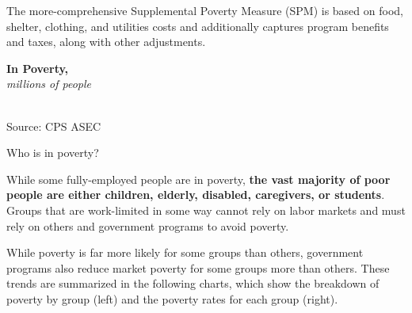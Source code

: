 \documentclass{report}
\newcommand{\barylab}[2]{yticklabel style={text width=#1, align=right, 
		style={black!70}, text height=#2},}
\newcommand{\bbar}[2]{extra #1 ticks = {{#2}}, extra #1 tick labels = ,
		extra #1 tick style = {grid=major, grid style={thick, black!25}},}
\newcommand{\barplotnogrid}{xbar=0pt, axis line style={draw=none},
	    yticklabel style={align=left, anchor=east},
      		xmajorticks=false, ymajorgrids=false,   
	    ytick=data, tickwidth=0pt, area legend, reverse legend,
	    nodes near coords align={horizontal},}
\begin{document}
{\begin{minipage}{1.0\textwidth}
The more-comprehensive Supplemental Poverty Measure (SPM) is based on food, shelter, clothing, and utilities costs and additionally captures program benefits and taxes, along with other adjustments. 
\end{minipage} \hspace{6mm}
\begin{minipage}{0.19\textwidth}
\normalsize \textbf{In Poverty, }\\
\footnotesize{\textit{millions of people}}\\
  \hspace*{-3mm} \\
\footnotesize{Source: CPS ASEC}
\vfill
\end{minipage}
\vspace{1.5mm}

\begin{minipage}{1.0\textwidth}
\normalsize Who is in poverty?
\vspace{-0.5mm}

\small While some fully-employed people are in poverty, \textbf{the vast majority of poor people are either children, elderly, disabled, caregivers, or students}. Groups that are work-limited in some way cannot rely on labor markets and must rely on others and government programs to avoid poverty.  

While poverty is far more likely for some groups than others, government programs also reduce market poverty for some groups more than others. These trends are summarized in the following charts, which show the breakdown of poverty by group (left) and the poverty rates for each group (right). 



\end{minipage}}
\end{document}
